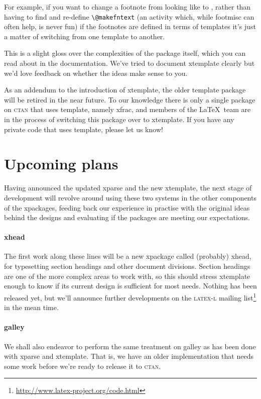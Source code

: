 \documentclass{ltnews}
\begin{document}
For example, if you want to change a footnote from looking like {\footnotesize{}} to {\footnotesize{}}, rather than having to find and re-define \verb|\@makefntext| (an activity which, while \textsf{footmisc} can often help, is never fun) if the footnotes are defined in terms of templates it's just a matter of switching from one template to another.

This is a slight gloss over the complexities of the package itself, which you can read about in the documentation. We've tried to document \textsf{xtemplate} clearly but we'd love feedback on whether the ideas make sense to you.

As an addendum to the introduction of \textsf{xtemplate}, the older \textsf{template} package will be retired in the near future. To our knowledge there is only a single package on \textsc{ctan} that uses \textsf{template}, namely \textsf{xfrac}, and members of the \LaTeX\ team are in the process of switching this package over to \textsf{xtemplate}. If you have any private code that uses \textsf{template}, please let us know!


\section{Upcoming plans}

Having announced the updated \textsf{xparse} and the new \textsf{xtemplate}, the next stage of development will revolve around using these two systems in the other components of the \textsf{xpackages}, feeding back our experience in practise with the original ideas behind the designs and evaluating if the packages are meeting our expectations.

\paragraph{\textsf{xhead}}
The first work along these lines will be a new \textsf{xpackage} called (probably) \textsf{xhead}, for typesetting section headings and other document divisions.
Section headings are one of the more complex areas to work with, so this should stress \textsf{xtemplate} enough to know if its current design is sufficient for most needs.
Nothing has been released yet, but we'll announce further developments on the \textsc{latex-l} mailing list\footnote{\url{http://www.latex-project.org/code.html}} in the mean time.

\paragraph{\textsf{galley}}
We shall also endeavor to perform the same treatment on \textsf{galley} as has been done with \textsf{xparse} and \textsf{xtemplate}. That is, we have an older implementation that needs some work before we're ready to release it to \textsc{ctan}.
\end{document}
